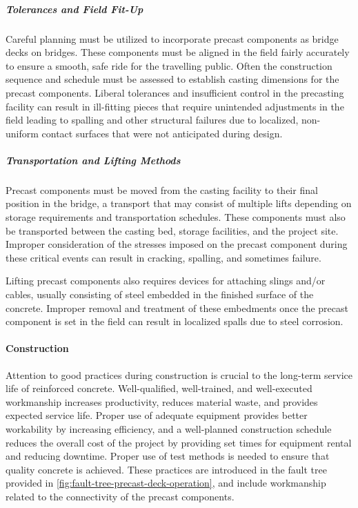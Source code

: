 \subparagraph{Tolerances and Field Fit-Up}
Careful planning must be utilized to incorporate precast components as bridge decks on bridges. These components must be aligned in the field fairly accurately to ensure a smooth, safe ride for the travelling public. Often the construction sequence and schedule must be assessed to establish casting dimensions for the precast components. Liberal tolerances and insufficient control in the precasting facility can result in ill-fitting pieces that require unintended adjustments in the field leading to spalling and other structural failures due to localized, non-uniform contact surfaces that were not anticipated during design.

\subparagraph{Transportation and Lifting Methods}
Precast components must be moved from the casting facility to their final position in the bridge, a transport that may consist of multiple lifts depending on storage requirements and transportation schedules. These components must also be transported between the casting bed, storage facilities, and the project site. Improper consideration of the stresses imposed on the precast component during these critical events can result in cracking, spalling, and sometimes failure.

Lifting precast components also requires devices for attaching slings and/or cables, usually consisting of steel embedded in the finished surface of the concrete. Improper removal and treatment of these embedments once the precast component is set in the field can result in localized spalls due to steel corrosion.

\paragraph{Construction}
Attention to good practices during construction is crucial to the long-term service life of reinforced concrete. Well-qualified, well-trained, and well-executed workmanship increases productivity, reduces material waste, and provides expected service life. Proper use of adequate equipment provides better workability by increasing efficiency, and a well-planned construction schedule reduces the overall cost of the project by providing set times for equipment rental and reducing downtime. Proper use of test methods is needed to ensure that quality concrete is achieved. These practices are introduced in the fault tree provided in \cref{fig:fault-tree-precast-deck-operation}, and include workmanship related to the connectivity of the precast components.

